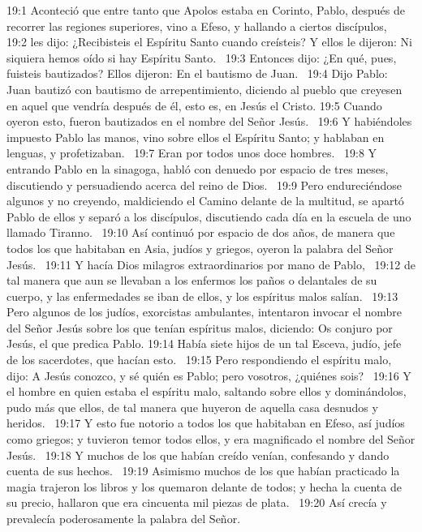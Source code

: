 19:1 Aconteció que entre tanto que Apolos estaba en Corinto, Pablo, después de recorrer las regiones superiores, vino a Efeso, y hallando a ciertos discípulos,  
19:2 les dijo: ¿Recibisteis el Espíritu Santo cuando creísteis? Y ellos le dijeron: Ni siquiera hemos oído si hay Espíritu Santo.  
19:3 Entonces dijo: ¿En qué, pues, fuisteis bautizados? Ellos dijeron: En el bautismo de Juan.  
19:4 Dijo Pablo: Juan bautizó con bautismo de arrepentimiento, diciendo al pueblo que creyesen en aquel que vendría después de él, esto es, en Jesús el Cristo. 
19:5 Cuando oyeron esto, fueron bautizados en el nombre del Señor Jesús.  
19:6 Y habiéndoles impuesto Pablo las manos, vino sobre ellos el Espíritu Santo; y hablaban en lenguas, y profetizaban.  
19:7 Eran por todos unos doce hombres.  
19:8 Y entrando Pablo en la sinagoga, habló con denuedo por espacio de tres meses, discutiendo y persuadiendo acerca del reino de Dios.  
19:9 Pero endureciéndose algunos y no creyendo, maldiciendo el Camino delante de la multitud, se apartó Pablo de ellos y separó a los discípulos, discutiendo cada día en la escuela de uno llamado Tiranno.  
19:10 Así continuó por espacio de dos años, de manera que todos los que habitaban en Asia, judíos y griegos, oyeron la palabra del Señor Jesús.  
19:11 Y hacía Dios milagros extraordinarios por mano de Pablo,  
19:12 de tal manera que aun se llevaban a los enfermos los paños o delantales de su cuerpo, y las enfermedades se iban de ellos, y los espíritus malos salían.  
19:13 Pero algunos de los judíos, exorcistas ambulantes, intentaron invocar el nombre del Señor Jesús sobre los que tenían espíritus malos, diciendo: Os conjuro por Jesús, el que predica Pablo. 
19:14 Había siete hijos de un tal Esceva, judío, jefe de los sacerdotes, que hacían esto.  
19:15 Pero respondiendo el espíritu malo, dijo: A Jesús conozco, y sé quién es Pablo; pero vosotros, ¿quiénes sois?  
19:16 Y el hombre en quien estaba el espíritu malo, saltando sobre ellos y dominándolos, pudo más que ellos, de tal manera que huyeron de aquella casa desnudos y heridos.  
19:17 Y esto fue notorio a todos los que habitaban en Efeso, así judíos como griegos; y tuvieron temor todos ellos, y era magnificado el nombre del Señor Jesús.  
19:18 Y muchos de los que habían creído venían, confesando y dando cuenta de sus hechos.  
19:19 Asimismo muchos de los que habían practicado la magia trajeron los libros y los quemaron delante de todos; y hecha la cuenta de su precio, hallaron que era cincuenta mil piezas de plata.  
19:20 Así crecía y prevalecía poderosamente la palabra del Señor.  
